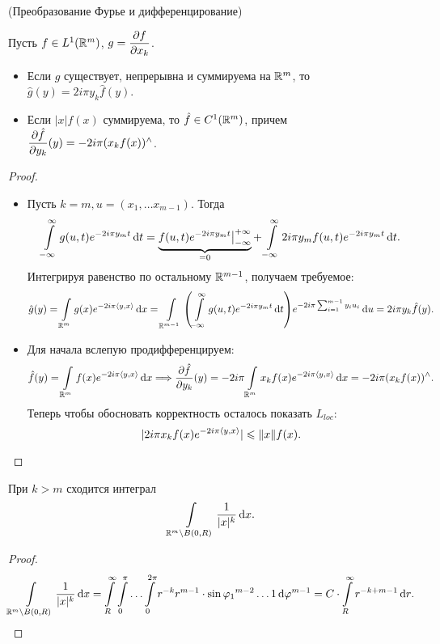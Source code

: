\begin{theorem}(Преобразование Фурье и дифференцирование)
   
    Пусть $f \in L^1(\mathbb{R}^m)$, $g = \dfrac{\partial f}{\partial x_k}$.
    \begin{itemize}
        \item Если $g$ существует, непрерывна и суммируема на $\mathbb{R}^m$,
            то $\hat{g}(y) = 2i\pi y_k \hat{f}(y)$.
        \item Если $|x|f(x)$ суммируема, то $\hat{f} \in C^1(\mathbb{R}^m)$, причем
            $\dfrac{\partial \hat{f}}{\partial y_k}(y) = -2i\pi (x_k f(x))^\wedge$.
    \end{itemize}
\end{theorem}
\begin{proof}
    \enewline
    \begin{itemize}
        \item Пусть $k = m, u = (x_1, \ldots x_{m - 1})$. Тогда
            \begin{align*}
                \int\limits_{-\infty}^\infty{g(u, t) e^{-2i\pi y_m t} \,\mathrm{d}t} =
                \underbrace{f(u, t) e^{-2i\pi y_m t}\big|_{-\infty}^{+\infty}}_{= 0}
                +\int\limits_{-\infty}^\infty{2i\pi y_m f(u, t) e^{-2i\pi y_m t} \,\mathrm{d}t}
            .\end{align*}
            Интегрируя равенство по остальному $\mathbb{R}^{m - 1}$, получаем требуемое:
            \[
                \hat{g}(y) = \intl_{\Rm}{g(x) e^{-2i\pi \scp{y}{x}} \dd x} =
                \intl_{\R^{m - 1}}{\parens*{\intl_{-\infty}^{\infty}{g(u, t) 
                        e^{-2i\pi y_m t}} \dd t} e^{-2i\pi \sum_{i = 1}^{m - 1}
                {y_i u_i}} \dd u} = 2i\pi y_k \hat{f}(y)
            .\]
        \item Для начала вслепую продифференцируем:
            \[
                \hat{f}(y) = \int\limits_{\mathbb{R}^m}{f(x) e^{-2i\pi \langle y, x \rangle} \,\mathrm{d} x} \Longrightarrow
                \dfrac{\partial \hat{f}}{\partial y_k}(y) = -2i\pi \int\limits_{\mathbb{R}^m}{x_k f(x) e^{-2i\pi
                \langle y, x \rangle} \,\mathrm{d} x} = -2i\pi (x_k f(x))^\wedge
            .\]
            Теперь чтобы обосновать корректность осталось показать $L_{loc}$:
            \[
                |2i\pi x_k f(x) e^{-2i\pi \langle y, x \rangle}| \leqslant \lVert x\rVert f(x)
            .\]
    \end{itemize}
\end{proof}

\begin{lemma}
    При $k > m$ сходится интеграл
    \[
        \int\limits_{\mathbb{R}^m \setminus B(0, R)}{\frac{1}{|x|^k} \,\mathrm{d} x}
    .\]
\end{lemma}
\begin{proof}
    \begin{align*}
        \int\limits_{\mathbb{R}^m \setminus B(0, R)}{\frac{1}{|x|^k} \,\mathrm{d} x} =
        \int\limits_{R}^\infty{\int\limits_0^\pi{\ldots \int\limits_0^{2\pi}{r^{-k} r^{m - 1}
        \cdot \sin{\varphi_1}^{m - 2} \ldots 1 \,\mathrm{d}\varphi^{m - 1}}}} =
        C \cdot \int\limits_{R}^\infty{r^{-k + m - 1} \,\mathrm{d}r}
    .\end{align*}
\end{proof}

